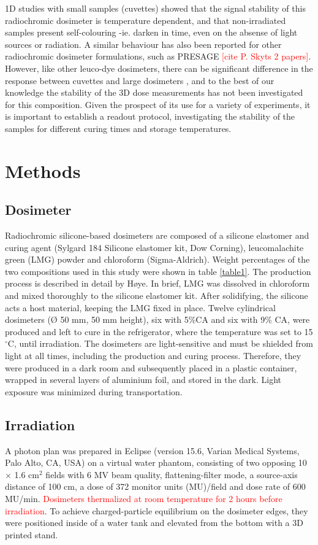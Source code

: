 \documentclass[12pt,twoside]{article}   %
\begin{document}
1D studies with small samples (cuvettes) showed that the signal stability of this radiochromic dosimeter is temperature dependent, and that non-irradiated samples present self-colouring -ie. darken in time, even on the absense of light sources or radiation\cite{Hoye2017a}. A similar behaviour has also been reported for other radiochromic dosimeter formulations, such as PRESAGE \textcolor{red}{[cite P. Skyts 2 papers]}. However, like other leuco-dye dosimeters, there can be significant difference in the response between cuvettes and large dosimeters \cite{Schreiner2015}, and to the best of our knowledge the stability of the 3D dose measurements has not been investigated for this composition. Given the prospect of its use for a variety of experiments, it is important to establish a readout protocol, investigating the stability of the samples for different curing times and storage temperatures.

\section{Methods}
\subsection{Dosimeter}
Radiochromic silicone-based dosimeters are composed of a silicone elastomer and curing agent (Sylgard 184 Silicone elastomer kit, Dow Corning), leucomalachite green (LMG) powder and chloroform (Sigma-Aldrich). Weight percentages of the two compositions used in this study were shown in table \ref{table1}. The production process is described in detail by H\o ye\cite{Hoye2015}. In brief, LMG was dissolved in chloroform and mixed thoroughly to the silicone elastomer kit. After solidifying, the silicone acts a host material, keeping the LMG fixed in place. Twelve cylindrical dosimeters (Ø 50 mm, 50 mm height), six with 5\%CA and six with 9\% CA, were produced and left to cure in the refrigerator, where the temperature was set to 15${}^\circ$C, until irradiation. The dosimeters are light-sensitive and must be shielded from light at all times, including the production and curing process. Therefore, they were produced in a dark room and subsequently placed in a plastic container, wrapped in several layers of aluminium foil, and stored in the dark. Light exposure was minimized during transportation.

\subsection{Irradiation}
A photon plan was prepared in Eclipse (version 15.6, Varian Medical Systems, Palo Alto, CA, USA) on a virtual water phantom, consisting of two opposing 10 $\times$ 1.6 cm${}^2$ fields with 6 MV beam quality, flattening-filter mode, a source-axis distance of 100 cm, a dose of 372 monitor units (MU)/field and dose rate of 600 MU/min. \textcolor{red}{Dosimeters thermalized at room temperature for 2 hours before irradiation}. To achieve charged-particle equilibrium on the dosimeter edges, they were positioned inside of a water tank and elevated from the bottom with a 3D printed stand. \par 
\end{document}
